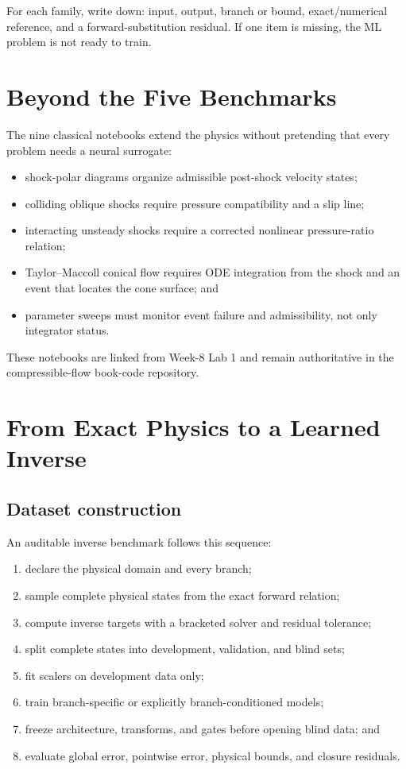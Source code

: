 \documentclass[11pt]{article}
\begin{document}
\begin{learningbox}
For each family, write down: input, output, branch or bound, exact/numerical
reference, and a forward-substitution residual. If one item is missing, the ML
problem is not ready to train.
\end{learningbox}

\section{Beyond the Five Benchmarks}
The nine classical notebooks extend the physics without pretending that every
problem needs a neural surrogate:
\begin{itemize}
\item shock-polar diagrams organize admissible post-shock velocity states;
\item colliding oblique shocks require pressure compatibility and a slip line;
\item interacting unsteady shocks require a corrected nonlinear pressure-ratio relation;
\item Taylor--Maccoll conical flow requires ODE integration from the shock and an event that locates the cone surface; and
\item parameter sweeps must monitor event failure and admissibility, not only integrator status.
\end{itemize}
These notebooks are linked from Week-8 Lab 1 and remain authoritative in the
compressible-flow book-code repository.

\section{From Exact Physics to a Learned Inverse}
\subsection{Dataset construction}
An auditable inverse benchmark follows this sequence:
\begin{enumerate}
\item declare the physical domain and every branch;
\item sample complete physical states from the exact forward relation;
\item compute inverse targets with a bracketed solver and residual tolerance;
\item split complete states into development, validation, and blind sets;
\item fit scalers on development data only;
\item train branch-specific or explicitly branch-conditioned models;
\item freeze architecture, transforms, and gates before opening blind data; and
\item evaluate global error, pointwise error, physical bounds, and closure residuals.
\end{enumerate}
\end{document}
